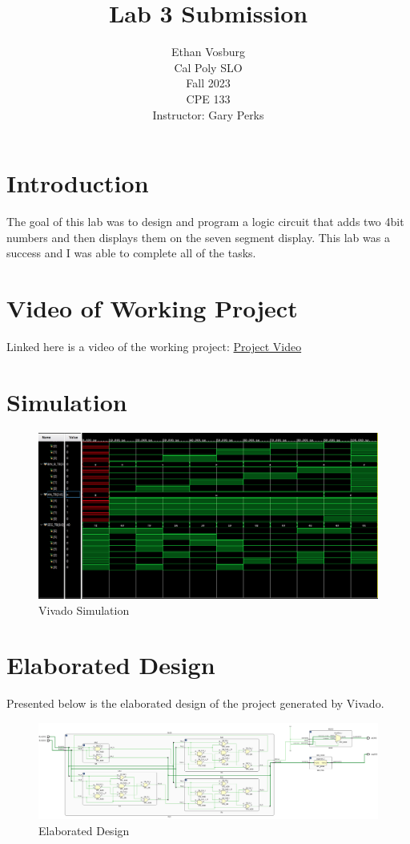 \documentclass[12pt]{article}
\title{Lab 3 Submission}
\author{Ethan Vosburg\\
    Cal Poly SLO \\
    Fall 2023\\
    CPE 133\\
    Instructor: Gary Perks
}
\begin{document}
\maketitle

\newpage

\section{Introduction}

The goal of this lab was to design and program a logic circuit that adds two 4bit numbers and then displays them on the seven segment display. This lab was a success and I was able to complete all of the tasks.

\section{Video of Working Project}

Linked here is a video of the working project: \href{https://youtu.be/RuO1vYSFrW4}{Project Video}

\section{Simulation}

\begin{figure}[h]
    \centering
    \includegraphics[width=.8\textwidth]{Figures/CPE 133 Lab 3 Simulation.png}
    \caption{Vivado Simulation}
    \label{fig:simulation}
\end{figure}

\section{Elaborated Design}

Presented below is the elaborated design of the project generated by Vivado.

\begin{figure}[h]
    \centering
    \includegraphics[width=.95\textwidth]{Figures/CPE 133 Lab 3 Elaboragted Design.png}
    \caption{Elaborated Design}
    \label{fig:elaborateddesign}
\end{figure}
\end{document}
